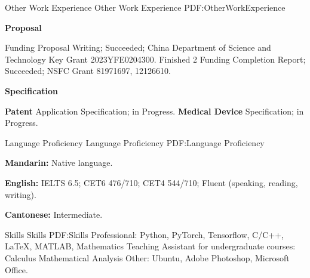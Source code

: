 \documentclass[a4paper,MMMyyyy,nonstopmode]{simpleresumecv}
\begin{document}
\begin{Body}
\Section
{{\large Other Work\newline
Experience}}
{{\large Other Work Experience}}
{PDF:OtherWorkExperience}


\Gap
\BulletItem
\textbf{Proposal}
\begin{Detail}
\SubBulletItem
Funding Proposal Writing; Succeeded; China Department of Science and Technology Key Grant 2023YFE0204300.
\SubBulletItem
Finished 2 Funding Completion Report; Succeeded; NSFC Grant 81971697, 12126610.
\end{Detail}
\Gap
\BulletItem
\textbf{Specification}
\hfill
\begin{Detail}
     \textbf{Patent} Application Specification; in Progress.
     \textbf{Medical Device} Specification; in Progress.
\end{Detail}


\Section
{{\large Language Proficiency}}
{{\large Language Proficiency}}
{PDF:Language Proficiency}

\BulletItem
\textbf{Mandarin:} Native language.

\Gap
\BulletItem
\textbf{English:} IELTS 6.5; CET6 476/710; CET4 544/710; Fluent (speaking, reading, writing).

\Gap
\BulletItem
\textbf{Cantonese:} Intermediate.


\Section
{{\large Skills}}
{{\large Skills}}
{PDF:Skills}
\Entry
\BulletItem
Professional:
\SubBulletItem
Python, PyTorch, Tensorflow, 
C/C++, 
{\LaTeX}, 
MATLAB, 
Mathematics
\BulletItem
Teaching Assistant for undergraduate courses:
\SubBulletItem
Calculus
\SubBulletItem
Mathematical Analysis
\BulletItem
Other:
\SubBulletItem
Ubuntu, 
Adobe Photoshop, 
Microsoft Office.



\end{Body}
\end{document}

